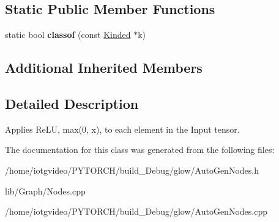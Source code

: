 \subsection*{Static Public Member Functions}
\begin{DoxyCompactItemize}
\item 
\mbox{\label{classglow_1_1_relu_node_a7e920c4022f9c34aae1c047edf65ff17}} 
static bool {\bfseries classof} (const \hyperlink{classglow_1_1_kinded}{Kinded} $\ast$k)
\end{DoxyCompactItemize}
\subsection*{Additional Inherited Members}


\subsection{Detailed Description}
Applies Re\+LU, max(0, x), to each element in the Input tensor. 

The documentation for this class was generated from the following files\+:\begin{DoxyCompactItemize}
\item 
/home/iotgvideo/\+P\+Y\+T\+O\+R\+C\+H/build\+\_\+\+Debug/glow/Auto\+Gen\+Nodes.\+h\item 
lib/\+Graph/Nodes.\+cpp\item 
/home/iotgvideo/\+P\+Y\+T\+O\+R\+C\+H/build\+\_\+\+Debug/glow/Auto\+Gen\+Nodes.\+cpp\end{DoxyCompactItemize}
